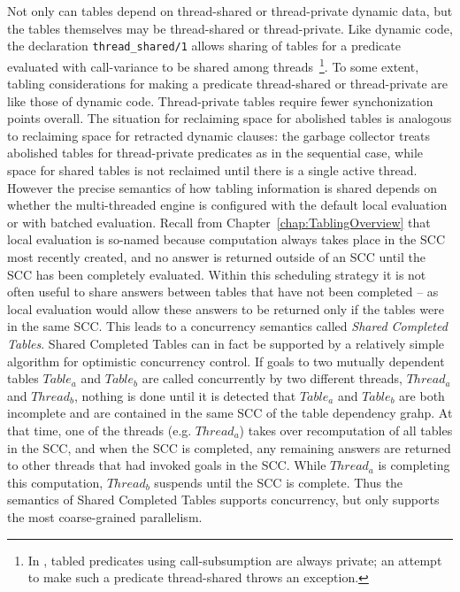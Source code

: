 Not only can tables depend on thread-shared or thread-private dynamic
data, but 
the tables themselves may be thread-shared or thread-private.  Like
dynamic code, the declaration {\tt thread\_shared/1} allows sharing of
tables for a predicate evaluated with call-variance to be shared among
threads~\footnote{In \version, tabled predicates using
  call-subsumption are always private; an attempt to make such a
  predicate thread-shared throws an exception.}.
%
To some extent, tabling considerations for making a predicate
thread-shared or thread-private are like those of dynamic code.
Thread-private tables require fewer synchonization points overall.
The situation for reclaiming space for abolished tables is analogous
to reclaiming space for retracted dynamic clauses: the garbage
collector treats abolished tables for thread-private predicates as in
the sequential case, while space for shared tables is not reclaimed
until there is a single active thread.  However the precise semantics
of how tabling information is shared depends on whether the
multi-threaded engine is configured with the default local evaluation
or with batched evaluation.  Recall from
Chapter~\ref{chap:TablingOverview} that local evaluation is so-named
because computation always takes place in the SCC most recently
created, and no answer is returned outside of an SCC until the SCC has
been completely evaluated.  Within this scheduling strategy it is not
often useful to share answers between tables that have not been
completed -- as local evaluation would allow these answers to be
returned only if the tables were in the same SCC.  This leads to a
concurrency semantics called {\em Shared Completed Tables}.  Shared
Completed Tables can in fact be supported by a relatively simple
algorithm for optimistic concurrency control.  If goals to two
mutually dependent tables $Table_a$ and $Table_b$ are called
concurrently by two different threads, $Thread_a$ and $Thread_b$,
nothing is done until it is detected that $Table_a$ and $Table_b$ are
both incomplete and are contained in the same SCC of the table
dependency grahp.  At that time, one of the threads (e.g. $Thread_a$)
takes over recomputation of all tables in the SCC, and when the SCC is
completed, any remaining answers are returned to other threads that
had invoked goals in the SCC.  While $Thread_a$ is completing this
computation, $Thread_b$ suspends until the SCC is complete.  Thus the
semantics of Shared Completed Tables supports concurrency, but only
supports the most coarse-grained parallelism.

